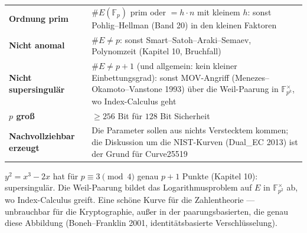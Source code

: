 \begin{merksatz}
\begin{center}
{\small
\renewcommand{\arraystretch}{1.5}
\begin{tabular}{@{}P{3.0cm}P{5.8cm}@{}}
\toprule
\textbf{Ordnung prim} & $\#E(\mathbb F_p)$ prim oder $= h\cdot n$ mit kleinem $h$: sonst Pohlig--Hellman (Band 20) in den kleinen Faktoren\\
\textbf{Nicht anomal} & $\#E\ne p$: sonst Smart--Satoh--Araki--Semaev, Polynomzeit (Kapitel 10, Bruchfall)\\
\textbf{Nicht supersingulär} & $\#E\ne p + 1$ (und allgemein: kein kleiner Einbettungsgrad): sonst MOV-Angriff (Menezes--Okamoto--Vanstone 1993) über die Weil-Paarung in $\mathbb F_{p^{k}}^{\times}$, wo Index-Calculus geht\\
\textbf{$p$ groß} & $\ge256$ Bit für $128$ Bit Sicherheit\\
\textbf{Nachvollziehbar erzeugt} & Die Parameter sollen aus nichts Verstecktem kommen; die Diskussion um die NIST-Kurven (Dual\_EC 2013) ist der Grund für Curve25519\\
\bottomrule
\end{tabular}}
\end{center}

$y^{2} = x^{3} - 2x$ hat für $p\equiv3\pmod4$ genau $p + 1$ Punkte (Kapitel 10): supersingulär. Die Weil-Paarung bildet das Logarithmusproblem auf $E$ in $\mathbb F_{p^{2}}^{\times}$ ab, wo Index-Calculus greift. Eine schöne Kurve für die Zahlentheorie --- unbrauchbar für die Kryptographie, außer in der paarungsbasierten, die genau diese Abbildung  (Boneh--Franklin 2001, identitätsbasierte Verschlüsselung).

\begin{center}
\begin{minipage}{0.88\textwidth}
\end{minipage}
\end{center}
\end{merksatz}

